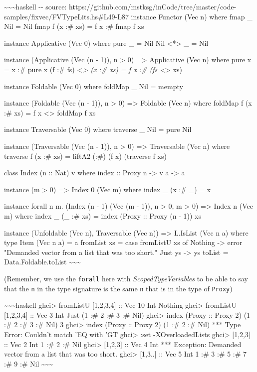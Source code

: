 \documentclass[]{article}
\begin{document}
\textasciitilde{}\textasciitilde{}\textasciitilde{}haskell -\/- source:
https://github.com/mstksg/inCode/tree/master/code-samples/fixvec/FVTypeLits.hs\#L49-L87
instance Functor (Vec n) where fmap \_ Nil = Nil fmap f (x :\# xs) = f x :\#
fmap f xs

instance Applicative (Vec 0) where pure \_ = Nil Nil \textless{}*\textgreater{}
\_ = Nil

instance (Applicative (Vec (n - 1)), n \textgreater{} 0) =\textgreater{}
Applicative (Vec n) where pure x = x :\# pure x (f :\# fs)
\textless{}\emph{\textgreater{} (x :\# xs) = f x :\# (fs
\textless{}}\textgreater{} xs)

instance Foldable (Vec 0) where foldMap \_ Nil = mempty

instance (Foldable (Vec (n - 1)), n \textgreater{} 0) =\textgreater{} Foldable
(Vec n) where foldMap f (x :\# xs) = f x \textless{}\textgreater{} foldMap f xs

instance Traversable (Vec 0) where traverse \_ Nil = pure Nil

instance (Traversable (Vec (n - 1)), n \textgreater{} 0) =\textgreater{}
Traversable (Vec n) where traverse f (x :\# xs) = liftA2 (:\#) (f x) (traverse f
xs)

class Index (n :: Nat) v where index :: Proxy n -\textgreater{} v a
-\textgreater{} a

instance (m \textgreater{} 0) =\textgreater{} Index 0 (Vec m) where index \_ (x
:\# \_) = x

instance forall n m. (Index (n - 1) (Vec (m - 1)), n \textgreater{} 0, m
\textgreater{} 0) =\textgreater{} Index n (Vec m) where index \_ (\_ :\# xs) =
index (Proxy :: Proxy (n - 1)) xs

instance (Unfoldable (Vec n), Traversable (Vec n)) =\textgreater{} L.IsList (Vec
n a) where type Item (Vec n a) = a fromList xs = case fromListU xs of Nothing
-\textgreater{} error "Demanded vector from a list that was too short." Just ys
-\textgreater{} ys toList = Data.Foldable.toList
\textasciitilde{}\textasciitilde{}\textasciitilde{}

(Remember, we use the \texttt{forall} here with \emph{ScopedTypeVariables} to be
able to say that the \texttt{n} in the type signature is the same \texttt{n}
that is in the type of \texttt{Proxy})

\textasciitilde{}\textasciitilde{}\textasciitilde{}haskell ghci\textgreater{}
fromListU {[}1,2,3,4{]} :: Vec 10 Int Nothing ghci\textgreater{} fromListU
{[}1,2,3,4{]} :: Vec 3 Int Just (1 :\# 2 :\# 3 :\# Nil) ghci\textgreater{} index
(Proxy :: Proxy 2) (1 :\# 2 :\# 3 :\# Nil) 3 ghci\textgreater{} index (Proxy ::
Proxy 2) (1 :\# 2 :\# Nil) *** Type Error: Couldn't match 'EQ with 'GT
ghci\textgreater{} :set -XOverloadedLists ghci\textgreater{} {[}1,2,3{]} :: Vec
2 Int 1 :\# 2 :\# Nil ghci\textgreater{} {[}1,2,3{]} :: Vec 4 Int *** Exception:
Demanded vector from a list that was too short. ghci\textgreater{} {[}1,3..{]}
:: Vec 5 Int 1 :\# 3 :\# 5 :\# 7 :\# 9 :\# Nil
\textasciitilde{}\textasciitilde{}\textasciitilde{}
\end{document}
